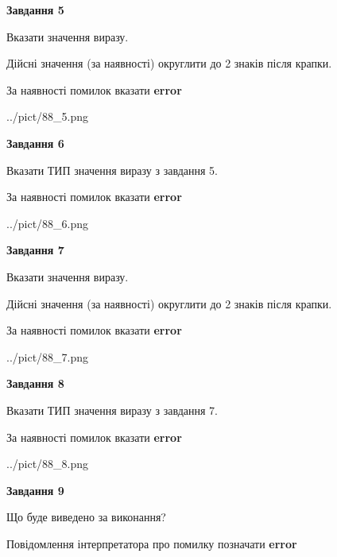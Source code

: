 \documentclass[11pt, ukrainian]{article}
\begin{document}
{\begin {large}
{\begin {center}\textbf{Завдання 5}\end {center}}\par
Вказати значення виразу. \par
Дійсні значення (за наявності) округлити до 2 знаків після крапки. \par
За наявності помилок вказати \textbf{error}

\begin{center}
	{../pict/88_5.png}
\end{center}
\newpage

{\begin {center}\textbf{Завдання 6}\end {center}}\par
Вказати ТИП значення виразу з завдання 5. \par
За наявності помилок вказати \textbf{error}

\begin{center}
	{../pict/88_6.png}
\end{center}
\newpage

{\begin {center}\textbf{Завдання 7}\end {center}}\par
Вказати значення виразу. \par
Дійсні значення (за наявності) округлити до 2 знаків після крапки. \par
За наявності помилок вказати \textbf{error}

\begin{center}
	{../pict/88_7.png}
\end{center}
\newpage

{\begin {center}\textbf{Завдання 8}\end {center}}\par
Вказати ТИП значення виразу з завдання 7. \par
За наявності помилок вказати \textbf{error}

\begin{center}
	{../pict/88_8.png}
\end{center}
\newpage

{\begin {center}\textbf{Завдання 9}\end {center}}\par
Що буде виведено за виконання? \par
Повідомлення інтерпретатора про помилку позначати \textbf{error}


\end{large}}
\end{document}
